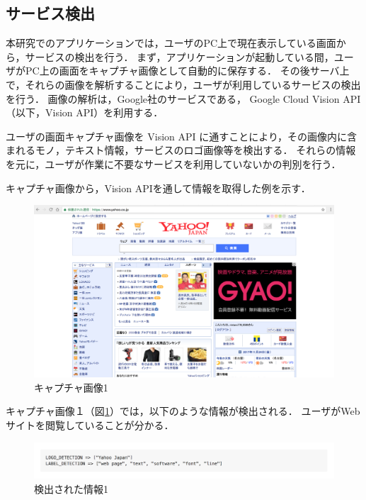 \subsection{サービス検出}
本研究でのアプリケーションでは，ユーザのPC上で現在表示している画面から，サービスの検出を行う．
まず，アプリケーションが起動している間，ユーザがPC上の画面をキャプチャ画像として自動的に保存する．
その後サーバ上で，それらの画像を解析することにより，ユーザが利用しているサービスの検出を行う．
画像の解析は，Google社のサービスである， Google Cloud Vision API （以下，Vision API）を利用する．

ユーザの画面キャプチャ画像を Vision API に通すことにより，その画像内に含まれるモノ，テキスト情報，サービスのロゴ画像等を検出する．
それらの情報を元に，ユーザが作業に不要なサービスを利用していないかの判別を行う．

\clearpage

キャプチャ画像から，Vision APIを通して情報を取得した例を示す．

\begin{figure}[h]
  \begin{center}
  \includegraphics[width=14.0cm]{graphics/screenshot01.png}
  \caption{キャプチャ画像1}
  \label{fig:screenshot01}
  \end{center}
\end{figure}

キャプチャ画像１（図\ref{fig:screenshot01}）では，以下のような情報が検出される．
ユーザがWebサイトを閲覧していることが分かる．

\begin{figure}[h]
  \begin{center}
  \includegraphics[width=14.0cm]{graphics/response01.png}
  \caption{検出された情報1}
  \label{fig:response01}
  \end{center}
\end{figure}

